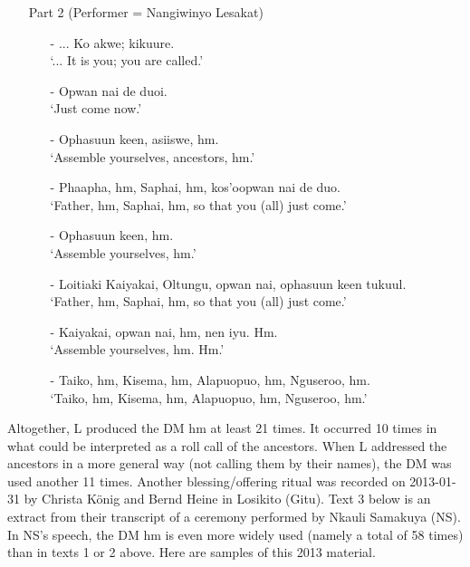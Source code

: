 \documentclass[output=paper,colorlinks,citecolor=brown]{langscibook}
\begin{document}
\begin{enumerate}
    \item[]     Part 2 (Performer = Nangiwinyo Lesakat)
    \begin{enumerate}
        \item[-]    ... Ko akwe; kikuure.\\
                    `... It is you; you are called.'
        \item[-]    Opwan nai de duoi.\\
                    `Just come now.'
        \item[-]    Ophasuun keen, asiiswe, hm.\\
                    `Assemble yourselves, ancestors, hm.'
        \item[-]    Phaapha, hm, Saphai, hm, kos’oopwan nai de duo.\\
                    `Father, hm, Saphai, hm, so that you (all) just come.'
        \item[-]    Ophasuun keen, hm.\\
                    `Assemble yourselves, hm.'
        \item[-]    Loitiaki Kaiyakai, Oltungu, opwan nai, ophasuun keen tukuul.\\
                    `Father, hm, Saphai, hm, so that you (all) just come.'
        \item[-]    Kaiyakai, opwan nai, hm, nen iyu. Hm.\\
                    `Assemble yourselves, hm. Hm.'
        \item[-]    Taiko, hm, Kisema, hm, Alapuopuo, hm, Nguseroo, hm.\\
                    `Taiko, hm, Kisema, hm, Alapuopuo, hm, Nguseroo, hm.'
    \end{enumerate}
\end{enumerate}

Altogether, L produced the DM hm at least 21 times. It occurred 10 times in what could be interpreted as a roll call of the ancestors. When L addressed the ancestors in a more general way (not calling them by their names), the DM was used another 11 times.
Another blessing/offering ritual was recorded on 2013-01-31 by Christa König and Bernd Heine in Losikito (Gitu). Text 3 below is an extract from their transcript of a ceremony performed by Nkauli Samakuya (NS). In NS’s speech, the DM hm is even more widely used (namely a total of 58 times) than in texts 1 or 2 above. Here are samples of this 2013 material.
\end{document}
